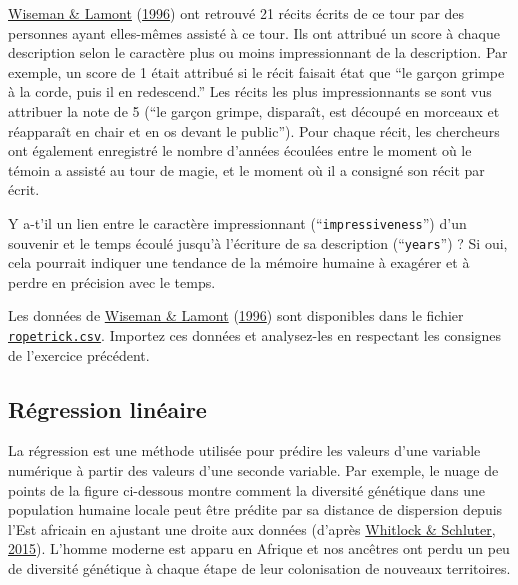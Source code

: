 \documentclass[
  a4paper,
]{article}
\begin{document}
\protect\hyperlink{ref-wiseman1996}{Wiseman \& Lamont} (\protect\hyperlink{ref-wiseman1996}{1996}) ont retrouvé 21 récits écrits de ce tour par des personnes ayant elles-mêmes assisté à ce tour. Ils ont attribué un score à chaque description selon le caractère plus ou moins impressionnant de la description. Par exemple, un score de 1 était attribué si le récit faisait état que ``le garçon grimpe à la corde, puis il en redescend.'' Les récits les plus impressionnants se sont vus attribuer la note de 5 (``le garçon grimpe, disparaît, est découpé en morceaux et réapparaît en chair et en os devant le public'').
Pour chaque récit, les chercheurs ont également enregistré le nombre d'années écoulées entre le moment où le témoin a assisté au tour de magie, et le moment où il a consigné son récit par écrit.

Y a-t'il un lien entre le caractère impressionnant (``\texttt{impressiveness}'') d'un souvenir et le temps écoulé jusqu'à l'écriture de sa description (``\texttt{years}'') ? Si oui, cela pourrait indiquer une tendance de la mémoire humaine à exagérer et à perdre en précision avec le temps.

Les données de \protect\hyperlink{ref-wiseman1996}{Wiseman \& Lamont} (\protect\hyperlink{ref-wiseman1996}{1996}) sont disponibles dans le fichier \href{https://besibo.github.io/Biometrie3/data/ropetrick.csv}{\texttt{ropetrick.csv}}. Importez ces données et analysez-les en respectant les consignes de l'exercice précédent.

\hypertarget{ruxe9gression-linuxe9aire}{%
\subsection{Régression linéaire}\label{ruxe9gression-linuxe9aire}}

La régression est une méthode utilisée pour prédire les valeurs d'une variable numérique à partir des valeurs d'une seconde variable. Par exemple, le nuage de points de la figure ci-dessous montre comment la diversité génétique dans une population humaine locale peut être prédite par sa distance de dispersion depuis l'Est africain en ajustant une droite aux données (d'après \protect\hyperlink{ref-whitlock2015}{Whitlock \& Schluter, 2015}). L'homme moderne est apparu en Afrique et nos ancêtres ont perdu un peu de diversité génétique à chaque étape de leur colonisation de nouveaux territoires.
\end{document}
